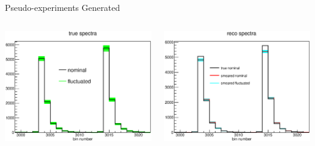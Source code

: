 \documentclass[aspectratio=169]{beamer}
\begin{document}
\begin{frame}{Pseudo-experiments Generated}
  \begin{columns}
    \begin{column}{.5\textwidth}
      \includegraphics[width=\textwidth]{figures/pseudoexp_true.eps}
    \end{column}
    \begin{column}{.5\textwidth}
      \includegraphics[width=\textwidth]{figures/pseudoexp_reco.eps}
    \end{column}
  \end{columns}
\end{frame}
\end{document}
